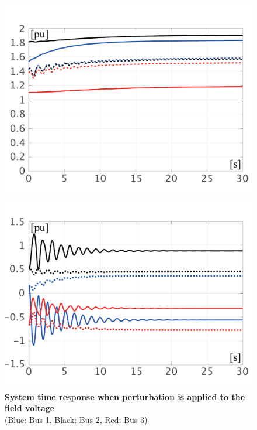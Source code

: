 \documentclass[graybox, envcountchap]{svmult}
\begin{document}
\begin{figure}[t]
{\begin{minipage}{0.49\linewidth}
    \includegraphics[width = 1.0\linewidth]{figs/EabsVV}
    \medskip
  \end{minipage}
  \begin{minipage}{0.49\linewidth}
    \centering
    \includegraphics[width = 1.0\linewidth]{figs/PQV}
    \medskip
  \end{minipage}
  }
  \medskip
  \caption{\textbf{System time response when perturbation is applied to the field voltage}
  \\  \centering(Blue: Bus 1, Black: Bus 2, Red: Bus 3)}
  \label{fig:KronV}
\medskip
\end{figure}
\end{document}
